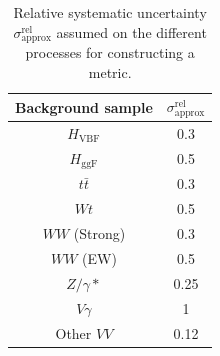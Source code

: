 \begin{table}[h]
    \centering
    \small
    \begin{tabular}{ c  | c}
        \toprule
        Background sample   & $\sigma^\text{rel}_\text{approx}$ \\
        \midrule
        $H_{\mathrm{VBF}}$  & 0.3                               \\
        $H_{\mathrm{ggF}}$  & 0.5                               \\
        $t\bar{t}$          & 0.3                               \\
        $Wt$                & 0.5                               \\
        $WW$ (Strong)       & 0.3                               \\
        $WW$ (EW)           & 0.5                               \\
        $Z/\gamma*$         & 0.25                              \\
        $V\gamma$           & 1                                 \\
        Other $VV$          & 0.12                              \\
        \bottomrule
    \end{tabular}
    \caption{Relative systematic uncertainty $\sigma^\text{rel}_\text{approx}$ assumed on the different processes for constructing a metric.}
    \label{tab:rough-uncertainties}
\end{table}


